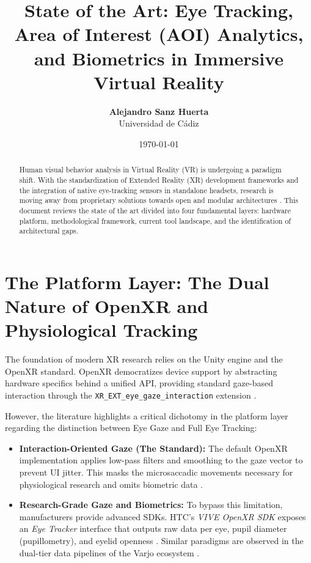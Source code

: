 \documentclass[12pt,a4paper]{article}
\title{State of the Art: Eye Tracking, Area of Interest (AOI) Analytics, and Biometrics in Immersive Virtual Reality}
\author{
    \textbf{Alejandro Sanz Huerta} \\
    Universidad de Cádiz
}
\date{\today}
\begin{document}
\maketitle

\begin{abstract}
    Human visual behavior analysis in Virtual Reality (VR) is undergoing a paradigm shift. With the standardization of Extended Reality (XR) development frameworks and the integration of native eye-tracking sensors in standalone headsets, research is moving away from proprietary solutions towards open and modular architectures \cite{clay2019}. This document reviews the state of the art divided into four fundamental layers: hardware platform, methodological framework, current tool landscape, and the identification of architectural gaps.
\end{abstract}

\section{The Platform Layer: The Dual Nature of OpenXR and Physiological Tracking}

The foundation of modern XR research relies on the Unity engine and the OpenXR standard. OpenXR democratizes device support by abstracting hardware specifics behind a unified API, providing standard gaze-based interaction through the \texttt{XR\_EXT\_eye\_gaze\_interaction} extension \cite{khronos_openxr}.

However, the literature highlights a critical dichotomy in the platform layer regarding the distinction between Eye Gaze and Full Eye Tracking:

\begin{itemize}
    \item \textbf{Interaction-Oriented Gaze (The Standard):} The default OpenXR implementation applies low-pass filters and smoothing to the gaze vector to prevent UI jitter. This masks the microsaccadic movements necessary for physiological research and omits biometric data \cite{khronos_openxr}.
    \item \textbf{Research-Grade Gaze and Biometrics:} To bypass this limitation, manufacturers provide advanced SDKs. HTC's \textit{VIVE OpenXR SDK} exposes an \textit{Eye Tracker} interface that outputs raw data per eye, pupil diameter (pupillometry), and eyelid openness \cite{htc_sdk}. Similar paradigms are observed in the dual-tier data pipelines of the Varjo ecosystem \cite{varjo_sdk}.
\end{itemize}
\end{document}

